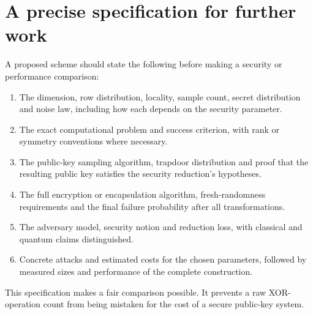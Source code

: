 \documentclass[11pt,a4paper]{article}
\begin{document}
\section{A precise specification for further work}
A proposed scheme should state the following before making a security or performance comparison:
\begin{enumerate}
\item The dimension, row distribution, locality, sample count, secret distribution and noise law, including how each depends on the security parameter.
\item The exact computational problem and success criterion, with rank or symmetry conventions where necessary.
\item The public-key sampling algorithm, trapdoor distribution and proof that the resulting public key satisfies the security reduction's hypotheses.
\item The full encryption or encapsulation algorithm, fresh-randomness requirements and the final failure probability after all transformations.
\item The adversary model, security notion and reduction loss, with classical and quantum claims distinguished.
\item Concrete attacks and estimated costs for the chosen parameters, followed by measured sizes and performance of the complete construction.
\end{enumerate}
This specification makes a fair comparison possible. It prevents a raw XOR-operation count from being mistaken for the cost of a secure public-key system.
\end{document}
